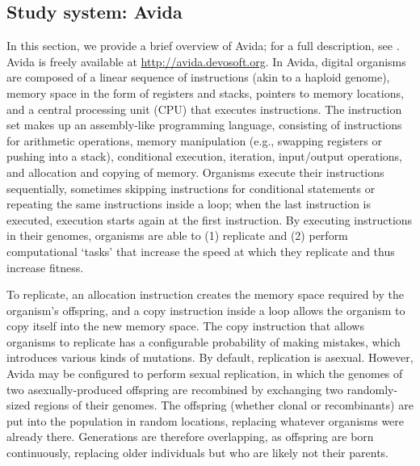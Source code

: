 \begin{doublespace}



\section*{Study system: Avida}
\label{sec:avida}

In this section, we provide a brief overview of Avida;
for a full description, see \cite{ofr04}.
%
Avida is freely available at \url{http://avida.devosoft.org}.
%
In Avida, digital organisms are composed of
a linear sequence of instructions (akin to a haploid genome),
memory space in the form of registers and stacks,
pointers to memory locations,
and a central processing unit (CPU) that executes instructions.
%
The instruction set makes up an assembly-like programming language,
consisting of instructions for arithmetic operations,
memory manipulation (e.g., swapping registers or pushing into a stack),
conditional execution, iteration, input/output operations,
and allocation and copying of memory.
%
Organisms execute their instructions sequentially,
sometimes skipping instructions for conditional statements
or repeating the same instructions inside a loop;
when the last instruction is executed,
execution starts again at the first instruction.
%
By executing instructions in their genomes,
organisms are able to (1) replicate and (2) perform computational `tasks'
that increase the speed at which they replicate and thus increase fitness.



To replicate, an allocation instruction creates the memory space
required by the organism's offspring, and a copy instruction inside a loop
allows the organism to copy itself into the new memory space.
%
The copy instruction that allows organisms to replicate
has a configurable probability of making mistakes,
which introduces various kinds of mutations.
%
By default, replication is asexual.
%
However, Avida may be configured to perform sexual replication,
in which the genomes of two asexually-produced offspring are recombined
by exchanging two randomly-sized regions of their genomes.
%
The offspring (whether clonal or recombinants) are put into the population
in random locations, replacing whatever organisms were already there.
%
Generations are therefore overlapping, as offspring are born continuously,
replacing older individuals but who are likely not their parents.




\end{doublespace}
